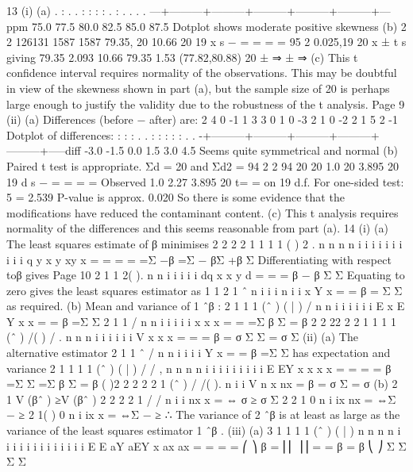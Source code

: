 \documentclass[a4paper,12pt]{article}
\begin{document}
13 (i) (a)
. : .
. : : : : . : . . . .
---+---------+---------+---------+---------+---------+---ppm
75.0 77.5 80.0 82.5 85.0 87.5
Dotplot shows moderate positive skewness
(b)
2
2
126131 1587 1587 79.35, 20 10.66
20 19
x s
−
= = = =
95%
2
0.025,19 20
x ± t s
giving 79.35 2.093 10.66 79.35 1.53 (77.82,80.88)
20
± ⇒ ± ⇒
(c) This t confidence interval requires normality of the observations.
This may be doubtful in view of the skewness shown in part (a), but
the sample size of 20 is perhaps large enough to justify the validity due
to the robustness of the t analysis.
Page 9
(ii) (a) Differences (before − after) are:
2 4 0 -1 1 3 3 0 1 0
-3 2 1 0 -2 2 1 5 2 -1
Dotplot of differences:
: : :
. . : : : : : . .
-+---------+---------+---------+---------+---------+-----diff
-3.0 -1.5 0.0 1.5 3.0 4.5
Seems quite symmetrical and normal
(b) Paired t test is appropriate.
Σd = 20 and Σd2 = 94
2
2
94 20 20 1.0 20 3.895
20 19
d s
−
= = = =
Observed 1.0 2.27
3.895
20
t= = on 19 d.f.
For one-sided test: 5%
= 2.539
P-value is approx. 0.020
So there is some evidence that the modifications have reduced the
contaminant content.
(c) This t analysis requires normality of the differences and this seems
reasonable from part (a).
14 (i) (a) The least squares estimate of β minimises
2 2 2 2
1 1 1 1 ( ) 2 . n n n n
i i i i i i i i i i q y x y xy x = = = = =Σ −β =Σ − βΣ +β Σ
Differentiating with respect toβ gives
Page 10
2
1 1 2( ). n n
i i i i i
dq x x y
d = = = β −
β Σ Σ
Equating to zero gives the least squares estimator as
1
1 2
1
ˆ
n
i i i
n
i i
x Y
x
=
=
β = Σ
Σ
as required.
(b) Mean and variance of 1 ˆβ :
2
1 1 1
(ˆ ) ( | ) / n n
i i i i i i E x E Y x x = = β =Σ Σ
2
1 1 / n n
i i i i i x x x = = =Σ β Σ = β
2 2 22 2 2
1 1 1 1
(ˆ ) /( ) / . n n n
i i i i i i V x x x = = = β = σ Σ Σ = σ Σ
(ii) (a) The alternative estimator 2 1 1
ˆ / n n
i i i i Y x = = β =Σ Σ has expectation and
variance
2 1 1 1 1
(ˆ ) ( | ) / / , n n n n
i i i i i i i i i E EY x x x x = = = = β =Σ Σ =Σ β Σ = β
( )2
2 2 2
2 1
(ˆ ) / /( ). n
i i V n x nx = β = σ Σ = σ
(b) 2 1 V (βˆ ) ≥V (βˆ )
2 2 2 2
1 / / n
i i nx x = ⇔ σ ≥ σ Σ
2 2
1 0 n
i ix nx = ⇔Σ − ≥
2
1( ) 0 n
i ix x = ⇔Σ − ≥
∴ The variance of 2 ˆβ is at least as large as the variance of the least
squares estimator 1 ˆβ .
(iii) (a) 3
1 1 1 1
(ˆ ) ( | )
n n n n
i i i i i i i i i
i i i i
E E aY aEY x ax ax
= = = =
⎛ ⎞
β = ⎜⎜ ⎟⎟ = = β = β
⎝ ⎠
Σ Σ Σ Σ
\end{document}
